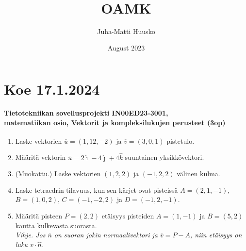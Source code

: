 \documentclass[12pt]{article}
\title{OAMK}
\author{Juha-Matti Huusko}
\date{August 2023}
\newcommand{\hatn}{\hat{n}}
\newcommand{\vu}{\overline{u}}
\newcommand{\vv}{\overline{v}}
\newcommand{\vw}{\overline{w}}
\newcommand{\vn}{\overline{n}}
\newcommand{\vi}{\hat{\imath}}
\newcommand{\vj}{\hat{\jmath}}
\newcommand{\vk}{\hat{k}}
\newcommand{\ratkaisu}[1]{\hfill{\color{blue}\quad\textrm{Ratkaisu: } #1}}
\newcommand{\ratkaisuu}[1]{{\color{blue}\textrm{Ratkaisu: } #1}}
\renewcommand{\ratkaisu}[1]{}
\renewcommand{\ratkaisuu}[1]{}
\newcommand{\vihje}[1]{{\color{red}Vihje. #1}}
\begin{document}
\thispagestyle{empty}

\section*{Koe 17.1.2024}
\paragraph*{Tietotekniikan sovellusprojekti IN00ED23-3001,\\ matematiikan osio, Vektorit ja kompleksilukujen perusteet (3op)}

\begin{enumerate}
\item Laske vektorien $\vu=(1,12,-2)$ ja $\vv=(3,0,1)$ pistetulo.\ratkaisu{$1$}


\item Määritä vektorin $\vu=2\vi-4\vj+4\vk$ suuntainen yksikkövektori.\ratkaisu{$\hat{u}=\frac{1}{3}\vi-\frac{2}{3}\vj+\frac{2}{3}\vk$}

\item (Muokattu.) Laske vektorien $(1,2,2)$ ja $(-1,2,2)$ välinen kulma.\ratkaisu{noin $63^\circ$}


\item Laske tetraedrin tilavuus, kun sen kärjet ovat pisteissä $A=(2,1,-1)$, $B=(1,0,2)$, $C=(-1,-2,2)$ ja $D=(-1,2,-1)$.
\ratkaisuu{$(\vu\times\vv)\cdot\vw=-24$, joten $V=4$}

\item Määritä pisteen $P=(2,2)$ etäisyys pisteiden $A=(1,-1)$ ja $B=(5,2)$ kautta kulkevasta suorasta.\\
\emph{Vihje. Jos $\vn$ on suoran jokin normaalivektori ja $\vv=P-A$, niin etäisyys on luku $\vv\cdot\hatn$.}\\
\ratkaisuu{suoran suuntavektori $\vu=(4,3)$, $\vn=(-3,4)$, $\hatn=(-0.6,0.8)$, $\vv=(1,3)$,\\ 
etäisyys on $(1,3)\cdot(-0.6,0.8)=-0.6+2.4=1.8$.}


\end{enumerate}
\end{document}
